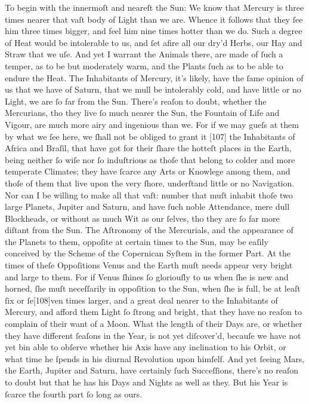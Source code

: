 \documentclass[letterpaper]{book}
\begin{document}
To begin with the innermoſt and neareſt the Sun: We know that Mercury is
three times nearer that vaſt body of Light than we are. Whence it follows
that they ſee him three times bigger, and feel him nine times hotter than we
do. Such a degree of Heat would be intolerable to us, and ſet afire all our
dry'd Herbs, our Hay and Straw that we uſe. And yet I warrant the Animals
there, are made of ſuch a temper, as to be but moderately warm, and the
Plants ſuch as to be able to endure the Heat. The Inhabitants of Mercury,
it's likely, have the ſame opinion of us that we have of Saturn, that we
mull be intolerably cold, and have little or no Light, we are ſo far from
the Sun. There's reaſon to doubt, whether the Mercurians, tho they live ſo
much nearer the Sun, the Fountain of Life and Vigour, are much more airy and
ingenious than we. For if we may gueſs at them by what we ſee here, we ſhall
not be obliged to grant it [107] the Inhabitants of Africa and Braſil, that
have got for their ſhare the hotteſt places in the Earth, being neither ſo
wiſe nor ſo induſtrious as thoſe that belong to colder and more temperate
Climates; they have ſcarce any Arts or Knowlege among them, and thoſe of
them that live upon the very ſhore, underſtand little or no Navigation.  Nor
can I be willing to make all that vaſt: number that muſt inhabit thoſe two
large Planets, Jupiter and Saturn, and have ſuch noble Attendance, mere dull
Blockheads, or without as much Wit as our ſelves, tho they are ſo far more
diſtant from the Sun. The Aſtronomy of the Mercurials, and the appearance of
the Planets to them, oppoſite at certain times to the Sun, may be eaſily
conceived by the Scheme of the Copernican Syſtem in the former Part. At the
times of theſe Oppoſitions Venus and the Earth muſt needs appear very bright
and large to them. For if Venus ſhines ſo gloriouſly to us when ſhe is new
and horned, ſhe muſt neceſſarily in oppoſition to the Sun, when ſhe is full,
be at leaſt ſix or ſe[108]ven times larger, and a great deal nearer to the
Inhabitants of Mercury, and afford them Light ſo ſtrong and bright, that
they have no reaſon to complain of their want of a Moon.  What the length of
their Days are, or whether they have different ſeaſons in the Year, is not
yet diſcover'd, becauſe we have not yet bin able to obſerve whether his Axis
have any inclination to his Orbit, or what time he ſpends in his diurnal
Revolution upon himſelf. And yet ſeeing Mars, the Earth, Jupiter and Saturn,
have certainly ſuch Succeſſions, there's no reaſon to doubt but that he has
his Days and Nights as well as they. But his Year is ſcarce the fourth part
ſo long as ours.
\end{document}
